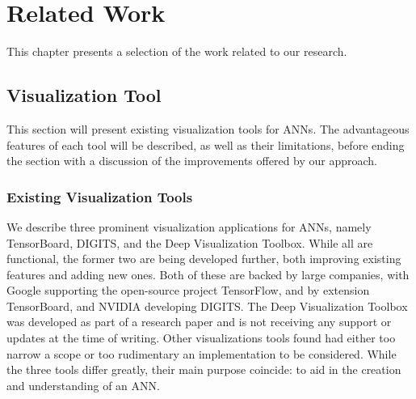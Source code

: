 
\chapter{Related Work}

This chapter presents a selection of the work related to our research.

\section{Visualization Tool}


This section will present existing visualization tools for ANNs. The advantageous features of each tool will be described, as well as their limitations, before ending the section with a discussion of the improvements offered by our approach. 

\subsection{Existing Visualization Tools}

\begin{comment}
\textit{The following are the most prominent visualization applications for ANNs. Other alternatives were found to be either too specific in what they provide, or not even in a working state of implementation. The three tools are very different in terms of functionality and the frameworks they support, but their main purpose is still the same: to aid in the creation and understanding of an artificial neural network.}
\end{comment}

We describe three prominent visualization applications for ANNs, namely TensorBoard, DIGITS, and the Deep Visualization Toolbox. While all are functional, the former two are being developed further, both improving existing features and adding new ones. Both of these are backed by large companies, with Google supporting the open-source project TensorFlow, and by extension TensorBoard, and NVIDIA developing DIGITS. The Deep Visualization Toolbox was developed as part of a research paper and is not receiving any support or updates at the time of writing. Other visualizations tools found had either too narrow a scope or too rudimentary an implementation to be considered. While the three tools differ greatly, their main purpose coincide: to aid in the creation and understanding of an ANN.

